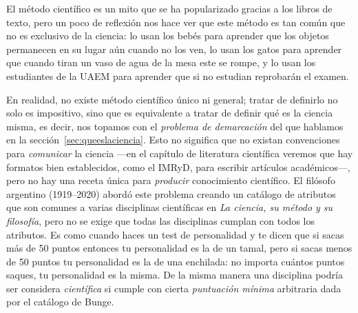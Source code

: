 El método científico es un mito que se ha popularizado gracias a los libros de texto, pero un poco de reflexión nos hace ver que este método es tan común que no es exclusivo de la ciencia: lo usan los bebés para aprender que los objetos permanecen en su lugar aún cuando no los ven, lo usan los gatos para aprender que cuando tiran un vaso de agua de la mesa este se rompe, y lo usan los estudiantes de la UAEM para aprender que si no estudian reprobarán el examen.

En realidad, no existe método científico único ni general; tratar de definirlo no solo es impositivo, sino que es equivalente a tratar de definir qué es la ciencia misma, es decir, nos topamos con el \emph{problema de demarcación} del que hablamos en la sección~\ref{sec:queeslaciencia}.
Esto no significa que no existan convenciones para \emph{comunicar} la ciencia —en el capítulo de literatura científica veremos que hay formatos bien establecidos, como el IMRyD, para escribir artículos académicos—, pero no hay una receta única para \emph{producir} conocimiento científico.
El filósofo argentino  (1919--2020) abordó este problema creando un catálogo de atributos que son comunes a varias disciplinas científicas en \emph{La ciencia, su método y su filosofía}\cite{Bunge1996}, pero no se exige que todas las disciplinas cumplan con todos los atributos.
Es como cuando haces un test de personalidad y te dicen que si sacas más de 50 puntos entonces tu personalidad es la de un tamal, pero si sacas menos de 50 puntos tu personalidad es la de una enchilada: no importa cuántos puntos saques, tu personalidad es la misma.
De la misma manera una disciplina podría ser considera \emph{científica} si cumple con cierta \emph{puntuación mínima} arbitraria dada por el catálogo de Bunge.

